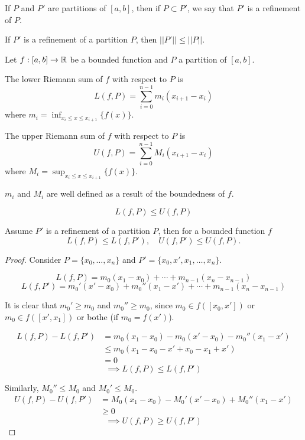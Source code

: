 \documentclass[a4paper,10pt]{article}
\begin{document}
\begin{defn}[Refinement]
	If $P$ and $P'$ are partitions of $[a,b]$, then if $P \subset
	P'$, we say that $P'$ is a refinement of $P$.
\end{defn}

\begin{rem}
	If $P'$ is a refinement of a partition $P$, then $||P'|| \leq ||P||$.
\end{rem}

\begin{defn}
	Let $f:[a,b] \to \mathbb{R}$ be a bounded function and $P$ a partition of $[a,b]$.

	The lower Riemann sum of $f$ with respect to $P$ is
	\[ L(f,P) = \sum_{i=0}^{n-1} m_i (x_{i+1} - x_i) \]
	where $m_i = \inf_{x_i \leq x \leq x_{i+1}} \{f(x)\}$.

	The upper Riemann sum of $f$ with respect to $P$ is
	\[ U(f,P) = \sum_{i=0}^{n-1} M_i (x_{i+1} - x_i) \]
	where $M_i = \sup_{x_i \leq x \leq x_{i+1}} \{f(x)\}$.

	$m_i$ and $M_i$ are well defined as a result of the boundedness of $f$.
\end{defn}

\begin{rem}
	\[ L(f,P) \leq U(f,P) \]
\end{rem}

\begin{lemma}
	Assume $P'$ is a refinement of a partition $P$, then for a bounded function $f$
	\[ L(f,P) \leq L(f,P'), \quad U(f,P') \leq U(f,P). \]
\end{lemma}

\begin{proof}
	Consider $P = \{x_0, \ldots, x_n\}$ and $P' = \{x_0, x', x_1, \ldots, x_n\}$.

	\[ L(f,P) = m_0(x_1 - x_0) + \cdots + m_{n-1}(x_n - x_{n-1}) \]
	\[ L(f,P') = m_0'(x' - x_0) + m_0''(x_1 - x') + \cdots + m_{n-1}(x_n - x_{n-1}) \]

	It is clear that $m_0' \geq m_0$ and $m_0'' \geq m_0$, since $m_0 \in f([x_0, x'])$
	or $m_0 \in f([x', x_1])$ or bothe (if $m_0 = f(x')$).

	\begin{align*}
		L(f,P) - L(f,P') &= m_0(x_1 - x_0) - m_0(x' - x_0) - m_0''(x_1 - x') \\
				 &\leq m_0(x_1 - x_0 - x' + x_0 - x_1 + x') \\
		   		 &= 0
	\end{align*}
	\[ \implies L(f,P) \leq L(f,P') \]

	Similarly, $M_0'' \leq M_0$ and $M_0' \leq M_0$.
	\begin{align*}
		U(f,P) - U(f,P') &= M_0(x_1 - x_0) - M_0'(x' - x_0) + M_0''(x_1 - x') \\
				 &\geq 0
	\end{align*}
	\[ \implies U(f,P) \geq U(f,P') \]
\end{proof}
\end{document}
